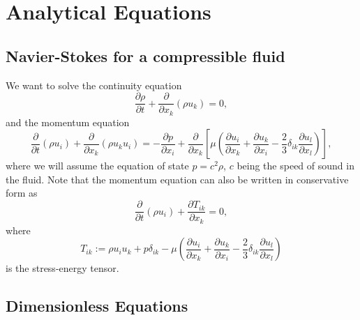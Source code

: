 \documentclass[11pt]{article}
\begin{document}
\maketitle


\section{Analytical Equations}

\subsection{Navier-Stokes for a compressible fluid}

We want to solve the continuity equation
\begin{equation}
\frac{\partial \rho}{\partial t} + \frac{\partial}{\partial x_k}\left(\rho u_k\right) = 0,
\end{equation}
and the momentum equation
\begin{equation}
\frac{\partial}{\partial t}\left(\rho u_i\right) + \frac{\partial}{\partial x_k}\left(\rho u_k u_i\right) = -\frac{\partial p}{\partial x_i} + \frac{\partial}{\partial x_k}\left[\mu\left(\frac{\partial u_i}{\partial x_k} + \frac{\partial u_k}{\partial x_i}- \frac{2}{3}\delta_{ik}\frac{\partial u_l}{\partial x_l}\right)\right],
\end{equation}
where we will assume the equation of state $p = c^2\rho$, $c$ being the speed of sound in the fluid. Note that the momentum equation can also be written in conservative form as
\begin{equation}
\frac{\partial}{\partial t}\left(\rho u_i\right) + \frac{\partial T_{ik}}{\partial x_k} = 0,
\end{equation}
where
\begin{equation}
T_{ik} := \rho u_i u_k + p\delta_{ik} - \mu\left(\frac{\partial u_i}{\partial x_k} + \frac{\partial u_k}{\partial x_i}- \frac{2}{3}\delta_{ik}\frac{\partial u_l}{\partial x_l}\right)
\end{equation}
is the stress-energy tensor.

\subsection{Dimensionless Equations}
\end{document}
